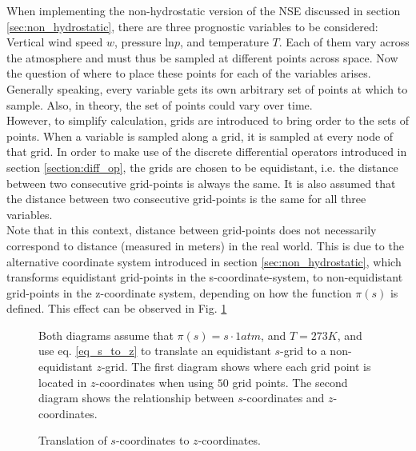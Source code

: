 When implementing the non-hydrostatic version of the NSE discussed in section \ref{sec:non_hydrostatic}, there are three prognostic variables to be considered: Vertical wind speed $w$, pressure $\text{ln}p$, and temperature $T$.
Each of them vary across the atmosphere and must thus be sampled at different points across space.
Now the question of where to place these points for each of the variables arises.\\
Generally speaking, every variable gets its own arbitrary set of points at which to sample.
Also, in theory, the set of points could vary over time.\\
However, to simplify calculation, grids are introduced to bring order to the sets of points.
When a variable is sampled along a grid, it is sampled at every node of that grid.
In order to make use of the discrete differential operators introduced in section \ref{section:diff_op}, the grids are chosen to be equidistant, i.e. the distance between two consecutive grid-points is always the same.
It is also assumed that the distance between two consecutive grid-points is the same for all three variables.\\
Note that in this context, distance between grid-points does not necessarily correspond to distance (measured in meters) in the real world.
This is due to the alternative coordinate system introduced in section \ref{sec:non_hydrostatic}, which transforms equidistant grid-points in the s-coordinate-system, to non-equidistant grid-points in the z-coordinate system, depending on how the function $\pi(s)$ is defined.
This effect can be observed in Fig. \ref{fig:s_grid}
\begin{figure}[ht]
    \caption{Translation of $s$-coordinates to $z$-coordinates.}
    \label{fig:s_grid}
    \small
    Both diagrams assume that $\pi (s)=s\cdot 1atm$, and $T=273K$, and use eq. \ref{eq_s_to_z} to translate an equidistant $s$-grid to a non-equidistant $z$-grid.
    The first diagram shows where each grid point is located in $z$-coordinates when using $50$ grid points. 
    The second diagram shows the relationship between $s$-coordinates and $z$-coordinates.
\end{figure}
